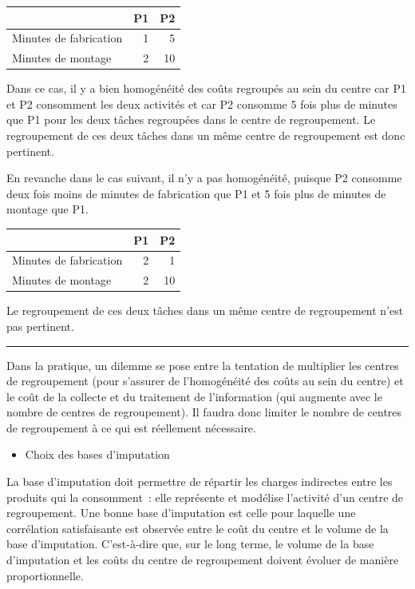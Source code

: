 \documentclass[oneside]{kaobook}
\begin{document}
\begin{center}
\begin{tabular}{lrr}
 & P1 & P2\\
\hline
Minutes de fabrication & 1 & 5\\
Minutes de montage & 2 & 10\\
\end{tabular}
\end{center}

Dans ce cas, il y a bien homogénéité des coûts regroupés au sein du centre car P1 et P2 consomment les deux activités et car P2 consomme 5 fois plus de minutes que P1 pour les deux tâches regroupées dans le
centre de regroupement. Le regroupement de ces deux tâches dans un même centre de regroupement est donc pertinent.

En revanche dans le cas suivant, il n'y a pas homogénéité, puisque P2 consomme deux fois moins de minutes de fabrication que P1 et 5 fois plus de minutes de montage que P1.

\begin{center}
\begin{tabular}{lrr}
 & P1 & P2\\
\hline
Minutes de fabrication & 2 & 1\\
Minutes de montage & 2 & 10\\
\end{tabular}
\end{center}

Le regroupement de ces deux tâches dans un même centre de regroupement n'est pas pertinent.

\noindent\rule{\textwidth}{0.5pt}

Dans la pratique, un dilemme se pose entre la tentation de multiplier les centres de regroupement (pour s'assurer de l'homogénéité des coûts au sein du centre) et le coût de la collecte et du traitement de
l'information (qui augmente avec le nombre de centres de regroupement).
Il faudra donc limiter le nombre de centres de regroupement à ce qui est réellement nécessaire.

\begin{itemize}
\item Choix des bases d'imputation
\end{itemize}
La base d'imputation doit permettre de répartir les charges indirectes entre les produits qui la consomment : elle représente et modélise l'activité d'un centre de regroupement. Une bonne base d'imputation est celle pour laquelle une corrélation satisfaisante est observée entre le coût du centre et le volume de la base d'imputation. C'est-à-dire que, sur le long terme, le volume de la base d'imputation et les coûts du centre de regroupement doivent évoluer de manière proportionnelle.
\end{document}
